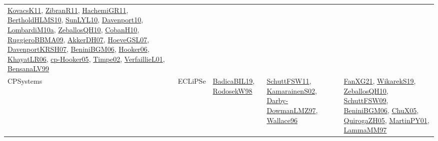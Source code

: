 {\begin{longtable}{lp{3cm}>{\raggedright}p{6cm}>{\raggedright}p{6cm}p{8cm}}
\href{articles/KovacsK11.pdf}{KovacsK11}\cite{KovacsK11}, \href{papers/ZibranR11.pdf}{ZibranR11}\cite{ZibranR11}, \href{articles/HachemiGR11.pdf}{HachemiGR11}\cite{HachemiGR11}, \href{papers/BertholdHLMS10.pdf}{BertholdHLMS10}\cite{BertholdHLMS10}, \href{papers/SunLYL10.pdf}{SunLYL10}\cite{SunLYL10}, \href{papers/Davenport10.pdf}{Davenport10}\cite{Davenport10}, \href{articles/LombardiM10a.pdf}{LombardiM10a}\cite{LombardiM10a}, \href{articles/ZeballosQH10.pdf}{ZeballosQH10}\cite{ZeballosQH10}, \href{papers/CobanH10.pdf}{CobanH10}\cite{CobanH10}, \href{articles/RuggieroBBMA09.pdf}{RuggieroBBMA09}\cite{RuggieroBBMA09}, \href{papers/AkkerDH07.pdf}{AkkerDH07}\cite{AkkerDH07}, \href{papers/HoeveGSL07.pdf}{HoeveGSL07}\cite{HoeveGSL07}, \href{papers/DavenportKRSH07.pdf}{DavenportKRSH07}\cite{DavenportKRSH07}, \href{papers/BeniniBGM06.pdf}{BeniniBGM06}\cite{BeniniBGM06}, \href{articles/Hooker06.pdf}{Hooker06}\cite{Hooker06}, \href{articles/KhayatLR06.pdf}{KhayatLR06}\cite{KhayatLR06}, \href{papers/cp-Hooker05.pdf}{cp-Hooker05}\cite{cp-Hooker05}, \href{articles/Timpe02.pdf}{Timpe02}\cite{Timpe02}, \href{papers/VerfaillieL01.pdf}{VerfaillieL01}\cite{VerfaillieL01}, \href{articles/BensanaLV99.pdf}{BensanaLV99}\cite{BensanaLV99}\\
CPSystems & ECLiPSe & \href{papers/BadicaBIL19.pdf}{BadicaBIL19}\cite{BadicaBIL19}, \href{papers/RodosekW98.pdf}{RodosekW98}\cite{RodosekW98} & \href{articles/SchuttFSW11.pdf}{SchuttFSW11}\cite{SchuttFSW11}, \href{papers/KamarainenS02.pdf}{KamarainenS02}\cite{KamarainenS02}, \href{articles/Darby-DowmanLMZ97.pdf}{Darby-DowmanLMZ97}\cite{Darby-DowmanLMZ97}, \href{articles/Wallace96.pdf}{Wallace96}\cite{Wallace96} & \href{articles/FanXG21.pdf}{FanXG21}\cite{FanXG21}, \href{articles/WikarekS19.pdf}{WikarekS19}\cite{WikarekS19}, \href{articles/ZeballosQH10.pdf}{ZeballosQH10}\cite{ZeballosQH10}, \href{papers/SchuttFSW09.pdf}{SchuttFSW09}\cite{SchuttFSW09}, \href{papers/BeniniBGM06.pdf}{BeniniBGM06}\cite{BeniniBGM06}, \href{papers/ChuX05.pdf}{ChuX05}\cite{ChuX05}, \href{papers/QuirogaZH05.pdf}{QuirogaZH05}\cite{QuirogaZH05}, \href{articles/MartinPY01.pdf}{MartinPY01}\cite{MartinPY01}, \href{articles/LammaMM97.pdf}{LammaMM97}\cite{LammaMM97}\\

\end{longtable}}
